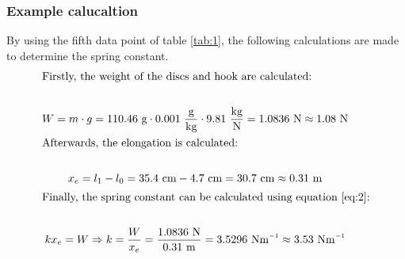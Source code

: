 \documentclass[a4paper, 10pt]{article}
\newcommand{\inv}{^{\raisebox{.2ex}{$\scriptscriptstyle-1$}}}
\newcommand{\unit}[1]{~\mathrm{#1}}
\begin{document}
\begin{justify}
\subsubsection{Example calucaltion}
By using the fifth data point of table \ref{tab:1}, the following calculations
are made to determine the spring constant.
\begin{gather*}
\intertext{Firstly, the weight of the discs and hook are calculated:} \\
 W = m \cdot g = 110.46\unit{g} \cdot 0.001\unit{\frac{g}{kg}} \cdot 9.81\unit{\frac{kg}{N}} = 1.0836\unit{N} \approx 1.08\unit{N}\\
\intertext{Afterwards, the elongation is calculated:} \\
 x_e = l_1 - l_0 = 35.4\unit{cm} - 4.7\unit{cm} = 30.7\unit{cm} \approx 0.31\unit{m}\\
\intertext{Finally, the spring constant can be calculated using equation \ref{eq:2}:} \\
k x_e = W \Rightarrow k = \frac{W}{x_e} = \frac{1.0836 \unit{N}}{0.31\unit{m}} = 3.5296\unit{Nm\inv} \approx 3.53\unit{Nm\inv} 
\end{gather*}

\end{justify}
\end{document}
